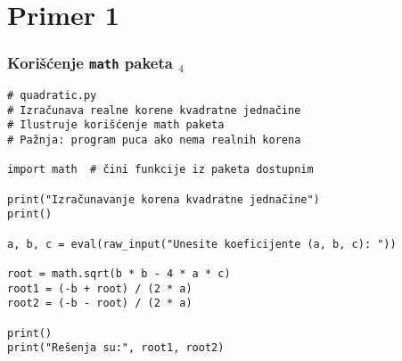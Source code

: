 \documentclass[utf8,compress]{beamer}
\begin{document}


\section{Primer 1}

\begin{frame}[fragile,shrink=5]
  \frametitle{Korišćenje \texttt{math} paketa $_4$}
\begin{verbatim}
# quadratic.py
# Izračunava realne korene kvadratne jednačine
# Ilustruje korišćenje math paketa
# Pažnja: program puca ako nema realnih korena

import math  # čini funkcije iz paketa dostupnim

print("Izračunavanje korena kvadratne jednačine")
print()

a, b, c = eval(raw_input("Unesite koeficijente (a, b, c): "))

root = math.sqrt(b * b - 4 * a * c)
root1 = (-b + root) / (2 * a)
root2 = (-b - root) / (2 * a)

print()
print("Rešenja su:", root1, root2)
\end{verbatim}
\end{frame}
\end{document}
